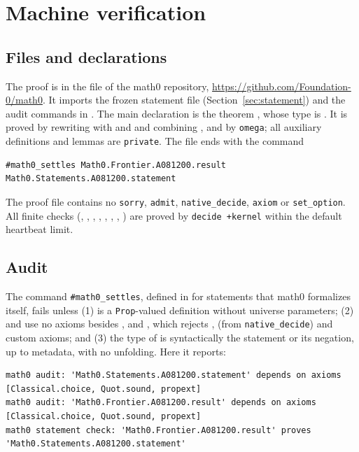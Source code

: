 \documentclass[11pt]{amsart}
\theoremstyle{plain}
\theoremstyle{definition}
\begin{document}
\section{Machine verification}\label{sec:lean}

\subsection*{Files and declarations}
The proof is in the file  of the math0 repository, \url{https://github.com/Foundation-0/math0}. It imports the frozen statement file  (Section~\ref{sec:statement}) and the audit commands in .
The main declaration is the theorem , whose type is . It is proved by rewriting with  and  and combining ,  and  by \texttt{omega}; all auxiliary definitions and lemmas are \texttt{private}. The file ends with the command
\begin{lstlisting}
#math0_settles Math0.Frontier.A081200.result Math0.Statements.A081200.statement
\end{lstlisting}
The proof file contains no \texttt{sorry}, \texttt{admit}, \texttt{native\_decide}, \texttt{axiom} or \texttt{set\_option}. All finite checks (, , , , , , , ) are proved by \texttt{decide +kernel} within the default heartbeat limit.

\subsection*{Audit}
The command \texttt{\#math0\_settles}, defined in  for statements that math0 formalizes itself, fails unless (1)  is a \texttt{Prop}-valued definition without universe parameters; (2)  and  use no axioms besides ,  and , which rejects ,  (from \texttt{native\_decide}) and custom axioms; and (3) the type of  is syntactically the statement or its negation, up to metadata, with no unfolding. Here it reports:
\begin{lstlisting}[basicstyle=\ttfamily\scriptsize]
math0 audit: 'Math0.Statements.A081200.statement' depends on axioms [Classical.choice, Quot.sound, propext]
math0 audit: 'Math0.Frontier.A081200.result' depends on axioms [Classical.choice, Quot.sound, propext]
math0 statement check: 'Math0.Frontier.A081200.result' proves 'Math0.Statements.A081200.statement'
\end{lstlisting}
\end{document}
